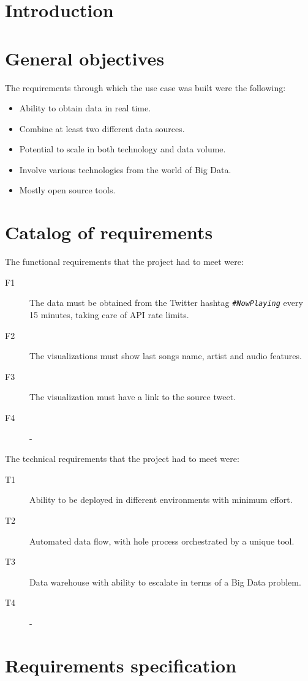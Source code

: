 
\section{Introduction}

\section{General objectives}

\nonzeroparskip The requirements through which the use case was built were the following:
\begin{itemize}
	\item Ability to obtain data in real time.
	\item Combine at least two different data sources.
	\item Potential to scale in both technology and data volume.
	\item Involve various technologies from the world of Big Data.
	\item Mostly open source tools.
\end{itemize}

\section{Catalog of requirements}

\nonzeroparskip The functional requirements that the project had to meet were:
\begin{description}
	\item[F1] The data must be obtained from the Twitter hashtag \texttt{\textit{\#NowPlaying}} every 15 minutes, taking care of API rate limits.
	\item[F2] The visualizations must show last songs name, artist and audio features.
	\item[F3] The visualization must have a link to the source tweet.
	\item[F4] -
\end{description}

\nonzeroparskip The technical requirements that the project had to meet were:
\begin{description}
	\item[T1] Ability to be deployed in different environments with minimum effort.
	\item[T2] Automated data flow, with hole process orchestrated by a unique tool.
	\item[T3] Data warehouse with ability to escalate in terms of a Big Data problem.
	\item[T4] -
\end{description}

\section{Requirements specification}


